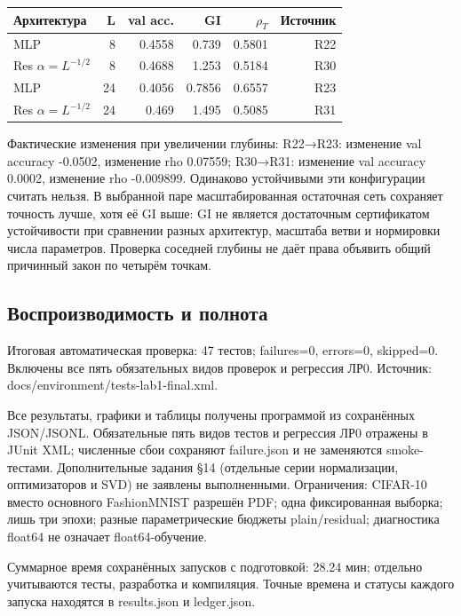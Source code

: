 \documentclass[10pt,a4paper]{article}
\begin{document}
\begin{center}\small
\begin{tabular}{lrrrrr}
\toprule
Архитектура & L & val acc. & GI & $\rho_T$ & Источник \\
\midrule
MLP & 8 & 0.4558 & 0.739 & 0.5801 & R22 \\
Res $\alpha=L^{-1/2}$ & 8 & 0.4688 & 1.253 & 0.5184 & R30 \\
MLP & 24 & 0.4056 & 0.7856 & 0.6557 & R23 \\
Res $\alpha=L^{-1/2}$ & 24 & 0.469 & 1.495 & 0.5085 & R31 \\
\bottomrule
\end{tabular}\end{center}

Фактические изменения при увеличении глубины: R22→R23: изменение val accuracy -0.0502, изменение rho 0.07559; R30→R31: изменение val accuracy 0.0002, изменение rho -0.009899. Одинаково устойчивыми эти конфигурации считать нельзя. В выбранной паре масштабированная остаточная сеть сохраняет точность лучше, хотя её GI выше: GI не является достаточным сертификатом устойчивости при сравнении разных архитектур, масштаба ветви и нормировки числа параметров. Проверка соседней глубины не даёт права объявить общий причинный закон по четырём точкам.

\subsection*{Воспроизводимость и полнота}

Итоговая автоматическая проверка: 47 тестов; failures=0, errors=0, skipped=0. Включены все пять обязательных видов проверок и регрессия ЛР0. Источник: docs/environment/tests-lab1-final.xml.

Все результаты, графики и таблицы получены программой  из сохранённых JSON/JSONL. Обязательные пять видов тестов и регрессия ЛР0 отражены в JUnit XML; численные сбои сохраняют failure.json и не заменяются smoke-тестами. Дополнительные задания §14 (отдельные серии нормализации, оптимизаторов и SVD) не заявлены выполненными. Ограничения: CIFAR-10 вместо основного FashionMNIST разрешён PDF; одна фиксированная выборка; лишь три эпохи; разные параметрические бюджеты plain/residual; диагностика float64 не означает float64-обучение.

Суммарное время сохранённых запусков с подготовкой: 28.24 мин; отдельно учитываются тесты, разработка и компиляция. Точные времена и статусы каждого запуска находятся в results.json и ledger.json.
\end{document}
